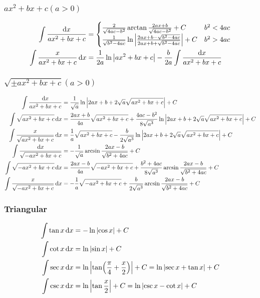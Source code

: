 \subsubsection{$ax^2+bx+c(a>0)$}
	\begin{align*}
		\int\frac{\dd{x}}{ax^2+bx+c}&=\begin{cases}
			\frac{2}{\sqrt{4ac-b^2}}\arctan\frac{2ax+b}{\sqrt{4ac-b^2}}+C							&b^2<4ac\\
			\frac{1}{\sqrt{b^2-4ac}}\ln\abs{\frac{2ax+b-\sqrt{b^2-4ac}}{2ax+b+\sqrt{b^2-4ac}}}+C	&b^2>4ac\\
		\end{cases}\\
		\int\frac{x}{ax^2+bx+c}\dd{x}&=\frac{1}{2a}\ln\abs{ax^2+bx+c}-\frac{b}{2a}\int\frac{\dd{x}}{ax^2+bx+c}\\
	\end{align*}
\subsubsection{$\sqrt{\pm ax^2+bx+c}(a>0)$}
	\begin{align*}
		\int\frac{\dd{x}}{ax^2+bx+c}&=\frac{1}{\sqrt{a}}\ln\abs{2ax+b+2\sqrt{a}\sqrt{ax^2+bx+c}}+C\\
		\int\sqrt{ax^2+bx+c}\dd{x}&=\frac{2ax+b}{4a}\sqrt{ax^2+bx+c}+\frac{4ac-b^2}{8\sqrt{a^3}}\ln\abs{2ax+b+2\sqrt{a}\sqrt{ax^2+bx+c}}+C\\
		\int\frac{x}{\sqrt{ax^2+bx+c}}\dd{x}&=\frac{1}{a}\sqrt{ax^2+bx+c}-\frac{b}{2\sqrt{a^3}}\ln\abs{2ax+b+2\sqrt{a}\sqrt{ax^2+bx+c}}+C\\
		\int\frac{\dd{x}}{\sqrt{-ax^2+bx+c}}&=-\frac{1}{\sqrt{a}}\arcsin\frac{2ax-b}{\sqrt{b^2+4ac}}+C\\
		\int\sqrt{-ax^2+bx+c}\dd{x}&=\frac{2ax-b}{4a}\sqrt{-ax^2+bx+c}+\frac{b^2+4ac}{8\sqrt{a^3}}\arcsin\frac{2ax-b}{\sqrt{b^2+4ac}}+C\\
		\int\frac{x}{\sqrt{-ax^2+bx+c}}\dd{x}&=-\frac{1}{a}\sqrt{-ax^2+bx+c}+\frac{b}{2\sqrt{a^3}}\arcsin\frac{2ax-b}{\sqrt{b^2+4ac}}+C\\
	\end{align*}
\subsubsection{Triangular}
	\begin{align*}
		\int\tan x\dd{x}&=-\ln\abs{\cos x}+C\\
		\int\cot x\dd{x}&=\ln\abs{\sin x}+C\\
		\int\sec x\dd{x}&=\ln\abs{\tan(\frac{\pi}{4}+\frac{x}{2})}+C=\ln\abs{\sec x+\tan x}+C\\
		\int\csc x\dd{x}&=\ln\abs{\tan\frac{x}{2}}+C=\ln\abs{\csc x-\cot x}+C\\
	\end{align*}
